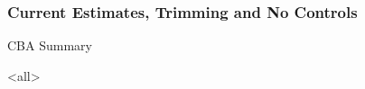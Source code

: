 \documentclass[static]{JJH-Beamer}
\begin{document}

\begin{frame}
\frametitle{Current Estimates, Trimming and No Controls}
\begin{center}
\begin{table}
	\caption{CBA Summary}
	\scalebox{.60}{}
\end{table}
\end{center}
\end{frame}
\clearpage


\appendix




\mode<all>

\savebox\hiddenbib{\parbox{\textwidth}{}}
\end{document}
